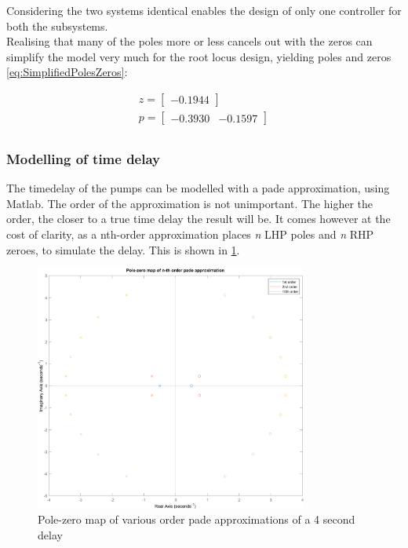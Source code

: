 Considering the two systems identical enables the design of only one controller for both the subsystems.\\
Realising that many of the poles more or less cancels out with the zeros can simplify the model very much for the root locus design, yielding poles and zeros \cref{eq:SimplifiedPolesZeros}:

 \begin{equation}\label{eq:SimplifiedPolesZeros}
 	\begin{gathered}
 		z = \begin{bmatrix}  -0.1944 \end{bmatrix} \\
 		p = \begin{bmatrix}  -0.3930&  -0.1597 \end{bmatrix} \\
 	\end{gathered}
 \end{equation}

\subsubsection{Modelling of time delay}
The timedelay of the pumps can be modelled with a pade approximation, using Matlab. The order of the approximation is not unimportant. The higher the order, the closer to a true time delay the result will be. It comes however at the cost of clarity, as a nth-order approximation places \textit{n} LHP poles and \textit{n} RHP zeroes, to simulate the delay. This is shown in \cref{fig:PadeApprox}.
\begin{figure}[h!]
	\centering
	\includegraphics[width=0.8\textwidth]{Pictures/PadeApprox.png}
	\caption{Pole-zero map of various order pade approximations of a 4 second delay}
	\label{fig:PadeApprox}
\end{figure}

